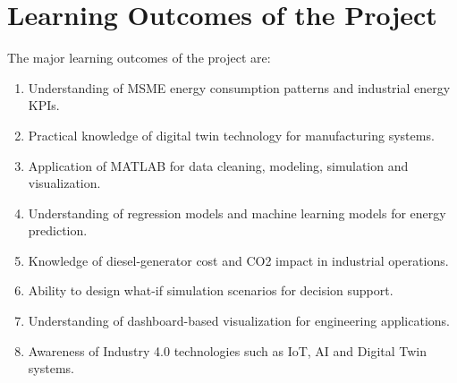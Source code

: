 \section{Learning Outcomes of the Project}
The major learning outcomes of the project are:
\begin{enumerate}
    \item Understanding of MSME energy consumption patterns and industrial energy KPIs.
    \item Practical knowledge of digital twin technology for manufacturing systems.
    \item Application of MATLAB for data cleaning, modeling, simulation and visualization.
    \item Understanding of regression models and machine learning models for energy prediction.
    \item Knowledge of diesel-generator cost and CO2 impact in industrial operations.
    \item Ability to design what-if simulation scenarios for decision support.
    \item Understanding of dashboard-based visualization for engineering applications.
    \item Awareness of Industry 4.0 technologies such as IoT, AI and Digital Twin systems.
\end{enumerate}
